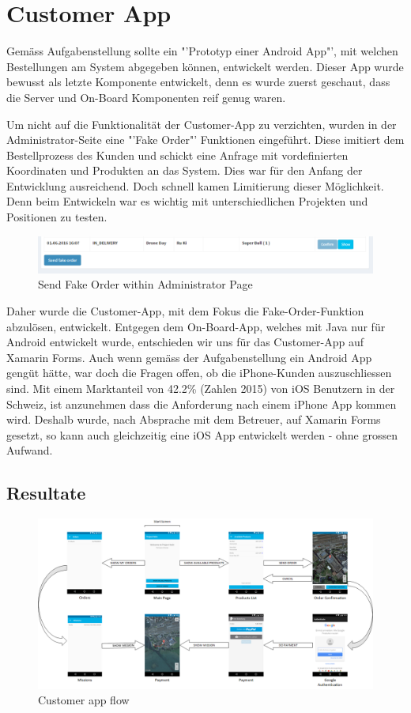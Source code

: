 \section{Customer App}
Gemäss Aufgabenstellung sollte ein "'Prototyp einer Android App"', mit welchen Bestellungen am System abgegeben können, entwickelt werden.
Dieser App wurde bewusst als letzte Komponente entwickelt, denn es wurde zuerst geschaut, dass die Server und On-Board Komponenten reif genug waren.

Um nicht auf die Funktionalität der Customer-App zu verzichten, wurden in der Administrator-Seite eine "'Fake Order"' Funktionen eingeführt. 
Diese imitiert dem Bestellprozess des Kunden und schickt eine Anfrage mit vordefinierten Koordinaten und Produkten an das System.
Dies war für den Anfang der Entwicklung ausreichend.
Doch schnell kamen Limitierung dieser Möglichkeit.
Denn beim Entwickeln war es wichtig mit unterschiedlichen Projekten und Positionen zu testen.
\begin{figure}[h]
	\centering
	\includegraphics[width=1\textwidth] {images/customer-app-fake-order.png}
	\caption{Send Fake Order within Administrator Page}
\end{figure}
Daher wurde die Customer-App, mit dem Fokus die Fake-Order-Funktion abzulösen, entwickelt.
Entgegen dem On-Board-App, welches mit Java nur für Android entwickelt wurde, entschieden wir uns für das Customer-App auf Xamarin Forms.
Auch wenn gemäss der Aufgabenstellung ein Android App gengüt hätte, war doch die Fragen offen, ob die iPhone-Kunden auszuschliessen sind.
Mit einem Marktanteil von 42.2\% (Zahlen 2015) \cite{ios-user} von iOS Benutzern in der Schweiz, ist anzunehmen dass die Anforderung nach einem iPhone App kommen wird.
Deshalb wurde, nach Absprache mit dem Betreuer, auf Xamarin Forms gesetzt, so kann auch gleichzeitig eine iOS App entwickelt werden - ohne grossen Aufwand.

\subsection{Resultate}
\begin{landscape}
\begin{figure}[h]
	\centering
	\includegraphics[width=0.8\paperheight] {images/customer-app-pages.png}
	\caption{Customer app flow}
\end{figure}
\end{landscape}

